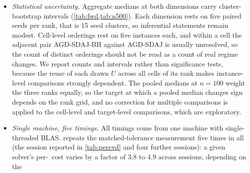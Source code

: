 \begin{itemize}
    $-0.011$ over the 540 paired instances at $n=100$ and $n=500$. The degree of invalidity, which reorders
    the methods on the equity-derived matrices, is therefore not a controlled
    factor of the family, and the findings that depend on it rest on perturbed
    matrices with computed references.
     adds four matrices from the literature, from $n=94$ to
    $n=3250$, measured against a computed rather than an exact reference; for
    the two largest that reference is capped and reaches
    $\nrm{\nabla\theta}_2\approx10^{-12}$ rather than $10^{-13}$, and no
    wall-clock times were taken. Four matrices cannot separate dimension from
    the other ways in which they differ. The equity-based instances of
    \cref{sec:thesis} use a factor model of one correlation matrix as the
    exact solution; those instances are only mildly invalid and have three
    replicates per setting, while the perturbed set has five draws per
    $\sigma$ and a computed reference. The sets of \cref{sec:thesis} rest on
    one base correlation matrix and those of \cref{sec:us2105} on a second,
    so there are two panels in all, not a sample of them.
  \item \emph{Statistical uncertainty.} Aggregate medians at both dimensions
    carry cluster-bootstrap intervals (\cref{tab:fwd,tab:n500}). Each
    dimension rests on five paired seeds per rank, that is 15 seed clusters,
    so inferential statements remain modest. Cell-level
    orderings rest on five instances each, and within a cell the adjacent pair
    AGD-SDAJ-BH against AGD-SDAJ is usually unresolved, so the count of
    distinct orderings should not be read as a count of real regime changes.
    We report counts and intervals rather than significance tests, because the
    reuse of each drawn $U$ across all cells of its rank makes instance-level
    comparisons strongly dependent. The pooled medians at $n=100$ weight the
    three ranks equally, so the target at which a pooled median changes sign
    depends on the rank grid, and no correction for multiple comparisons is
    applied to the cell-level and target-level comparisons, which are
    exploratory.
  \item \emph{Single machine, five timings.} All timings come from one
    machine with single-threaded BLAS.  repeats the
    matched-tolerance measurement five times in all (the session reported in
    \cref{tab:perevd} and four further sessions): a given solver's per-\EVD\
    cost varies by a factor of 3.8 to 4.9 across sessions, depending on the

\end{itemize}

